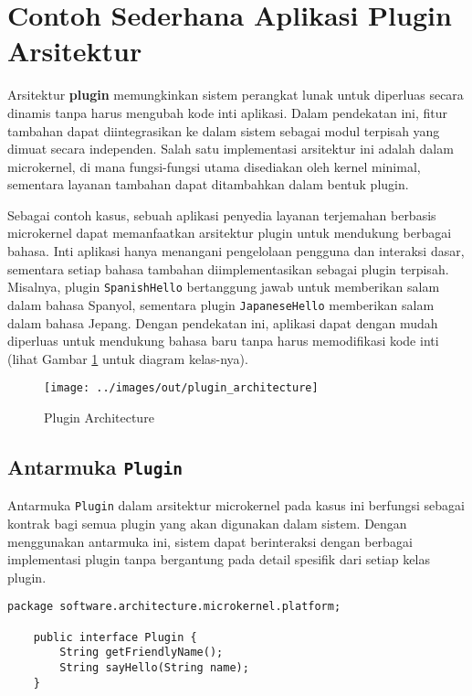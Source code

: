 \section{Contoh Sederhana Aplikasi Plugin Arsitektur}

Arsitektur \textbf{plugin} memungkinkan sistem perangkat lunak untuk diperluas secara dinamis tanpa harus mengubah kode inti aplikasi. Dalam pendekatan ini, fitur tambahan dapat diintegrasikan ke dalam sistem sebagai modul terpisah yang dimuat secara independen. Salah satu implementasi arsitektur ini adalah dalam microkernel, di mana fungsi-fungsi utama disediakan oleh kernel minimal, sementara layanan tambahan dapat ditambahkan dalam bentuk plugin.

Sebagai contoh kasus, sebuah aplikasi penyedia layanan terjemahan berbasis microkernel dapat memanfaatkan arsitektur plugin untuk mendukung berbagai bahasa. Inti aplikasi hanya menangani pengelolaan pengguna dan interaksi dasar, sementara setiap bahasa tambahan diimplementasikan sebagai plugin terpisah. Misalnya, plugin \texttt{SpanishHello} bertanggung jawab untuk memberikan salam dalam bahasa Spanyol, sementara plugin \texttt{JapaneseHello} memberikan salam dalam bahasa Jepang. Dengan pendekatan ini, aplikasi dapat dengan mudah diperluas untuk mendukung bahasa baru tanpa harus memodifikasi kode inti (lihat Gambar \ref{fig:plugin_architecture} untuk diagram kelas-nya).


\begin{figure}
	\centering
	\texttt{[image: ../images/out/plugin\_architecture]}
	\caption{Plugin Architecture}
	\label{fig:plugin_architecture}
\end{figure}

\subsection{Antarmuka \texttt{Plugin}}

Antarmuka \texttt{Plugin} dalam arsitektur microkernel pada kasus ini berfungsi sebagai kontrak bagi semua plugin yang akan digunakan dalam sistem. Dengan menggunakan antarmuka ini, sistem dapat berinteraksi dengan berbagai implementasi plugin tanpa bergantung pada detail spesifik dari setiap kelas plugin.

\begin{lstlisting}[style=JavaStyle, caption={Antarmuka \texttt{Plugin}}, label={lst:plugin-interface}]
	package software.architecture.microkernel.platform;
	
	public interface Plugin {
		String getFriendlyName();
		String sayHello(String name);
	}
\end{lstlisting}

